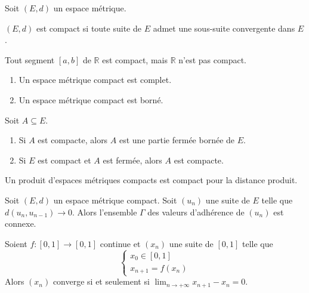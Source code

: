   Soit $(E,d)$ un espace métrique.

  \begin{theorem}
    $(E,d)$ est compact si toute suite de $E$ admet une sous-suite convergente dans $E$.
  \end{theorem}

  \begin{example}
    Tout segment $[a,b]$ de $\mathbb{R}$ est compact, mais $\mathbb{R}$ n'est pas compact.
  \end{example}

  \begin{proposition}
    \begin{enumerate}[label=(\roman*)]
      \item Un espace métrique compact est complet.
      \item Un espace métrique compact est borné.
    \end{enumerate}
  \end{proposition}

  \begin{proposition}
    Soit $A \subseteq E$.
    \begin{enumerate}[label=(\roman*)]
      \item Si $A$ est compacte, alors $A$ est une partie fermée bornée de $E$.
      \item Si $E$ est compact et $A$ est fermée, alors $A$ est compacte.
    \end{enumerate}
  \end{proposition}

  \begin{proposition}
    Un produit d'espaces métriques compacts est compact pour la distance produit.
  \end{proposition}


  \begin{application}
    Soit $(E, d)$ un espace métrique compact. Soit $(u_n)$ une suite de $E$ telle que $d(u_n,u_{n-1}) \longrightarrow 0$. Alors l'ensemble $\Gamma$ des valeurs d'adhérence de $(u_n)$ est connexe.
  \end{application}

  \begin{corollary}
    Soient $f : [0, 1] \rightarrow [0, 1]$ continue et $(x_n)$ une suite de $[0, 1]$ telle que
    \[ \begin{cases} x_0 \in [0, 1] \\ x_{n+1} = f(x_n) \end{cases} \]
    Alors $(x_n)$ converge si et seulement si $\lim_{n \rightarrow +\infty } x_{n+1} - x_n = 0$.
  \end{corollary}

